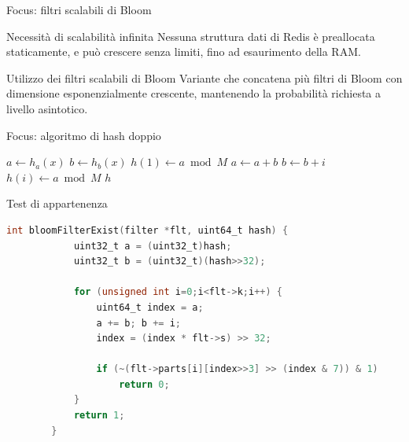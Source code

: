 \documentclass{beamer}
\begin{document}
	\begin{frame}{Focus: filtri scalabili di Bloom}

	  	\begin{block}{Necessità di scalabilità infinita}
	  	Nessuna struttura dati di Redis è preallocata staticamente,
	  	e può crescere senza limiti, fino ad esaurimento della RAM.
	  	\end{block}

	  	\begin{block}{Utilizzo dei filtri scalabili di Bloom}
	  	Variante che concatena più filtri di Bloom con dimensione
	  	esponenzialmente crescente, mantenendo la probabilità 
	  	richiesta a livello asintotico.
	  	\end{block}

	\end{frame}

	\begin{frame}[fragile]{Focus: algoritmo di hash doppio}
		\begin{algorithmic}[1]
			\State $a \gets h_a(x)$
			\State $b \gets h_b(x)$
			\State $h(1) \gets a \bmod M$
				\State $a \gets a+b$
				\State $b \gets b+i$
				\State $h(i) \gets a \bmod M$
			\EndFor
			\State \Return $h$
		\EndProcedure
		\end{algorithmic}
	\end{frame}

	\begin{frame}[fragile]{Test di appartenenza}
		\begin{lstlisting}[language=C]
		int bloomFilterExist(filter *flt, uint64_t hash) {
		    uint32_t a = (uint32_t)hash;
		    uint32_t b = (uint32_t)(hash>>32);

		    for (unsigned int i=0;i<flt->k;i++) {
		        uint64_t index = a;
		        a += b; b += i;
		        index = (index * flt->s) >> 32;

		        if (~(flt->parts[i][index>>3] >> (index & 7)) & 1)
		            return 0;
		    }
		    return 1;
		}
		\end{lstlisting}
	\end{frame}
\end{document}
